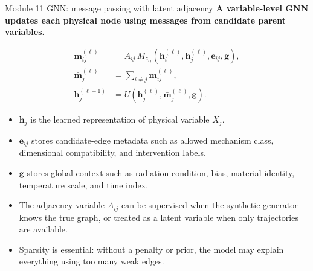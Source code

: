 \documentclass[aspectratio=169,10pt]{beamer}
\begin{document}
\begin{frame}{Module 11 GNN: message passing with latent adjacency}
\footnotesize
\textbf{A variable-level GNN updates each physical node using messages from candidate parent variables.}

\vspace{-0.2em}
\begin{align*}
\mathbf m_{ij}^{(\ell)}
&=A_{ij}\,M_{z_{ij}}\!
\left(\mathbf h_i^{(\ell)},\mathbf h_j^{(\ell)},\mathbf e_{ij},\mathbf g\right),\\[-0.1em]
\bar{\mathbf m}_{j}^{(\ell)}
&=\sum_{i\neq j}\mathbf m_{ij}^{(\ell)},\\[-0.1em]
\mathbf h_j^{(\ell+1)}
&=U\!\left(\mathbf h_j^{(\ell)},\bar{\mathbf m}_j^{(\ell)},\mathbf g\right).
\end{align*}

\vspace{-0.25em}
\begin{itemize}
    \item $\mathbf h_j$ is the learned representation of physical variable $X_j$.
    \item $\mathbf e_{ij}$ stores candidate-edge metadata such as allowed mechanism class, dimensional compatibility, and intervention labels.
    \item $\mathbf g$ stores global context such as radiation condition, bias, material identity, temperature scale, and time index.
    \item The adjacency variable $A_{ij}$ can be supervised when the synthetic generator knows the true graph, or treated as a latent variable when only trajectories are available.
    \item Sparsity is essential: without a penalty or prior, the model may explain everything using too many weak edges.
\end{itemize}
\end{frame}
\end{document}
